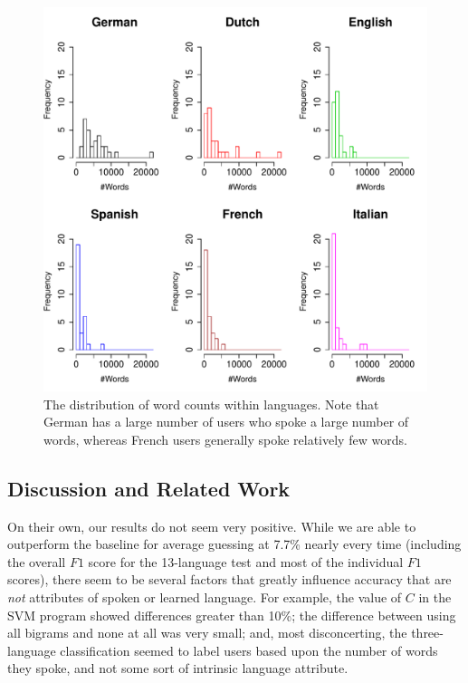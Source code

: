 \documentclass[11pt]{article}
\begin{document}
\begin{figure}
\centerline{\includegraphics[width=\linewidth]{figs/words_per_lang}}
\caption{The distribution of word counts within languages.  Note that German has a large number of users who spoke a large number of words, whereas French users generally spoke relatively few words.}
\label{fig:langs}
\end{figure}


\subsection{Discussion and Related Work}\label{sec:discussion}

On their own, our results do not seem very positive.  While we are able to outperform the baseline for average guessing at 7.7\% nearly every time (including the overall $F1$ score for the 13-language test and most of the individual $F1$ scores), there seem to be several factors that greatly influence accuracy that are {\it not} attributes of spoken or learned language.  For example, the value of $C$ in the SVM program showed differences greater than 10\%; the difference between using all bigrams and none at all was very small; and, most disconcerting, the three-language classification seemed to label users based upon the number of words they spoke, and not some sort of intrinsic language attribute.  
\end{document}
